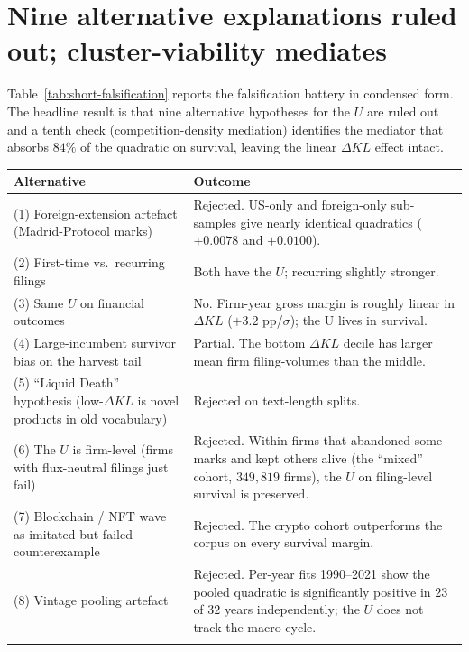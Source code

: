 \documentclass[11pt]{article}
\begin{document}
\section{Nine alternative explanations ruled out; cluster-viability mediates}

Table~\ref{tab:short-falsification} reports the falsification battery
in condensed form. The headline result is that nine alternative
hypotheses for the $U$ are ruled out and a tenth check
(competition-density mediation) identifies the mediator that absorbs
$84\%$ of the quadratic on survival, leaving the linear $\Delta KL$
effect intact.

\begin{table}[h]
\centering
\small
\begin{tabular}{p{4.0cm}p{11.2cm}}
\toprule
\textbf{Alternative} & \textbf{Outcome} \\
\midrule
(1) Foreign-extension artefact (Madrid-Protocol marks) &
Rejected. US-only and foreign-only sub-samples give nearly identical
quadratics ($+0.0078$ and $+0.0100$). \\
\addlinespace
(2) First-time vs.\ recurring filings &
Both have the $U$; recurring slightly stronger. \\
\addlinespace
(3) Same $U$ on financial outcomes &
No. Firm-year gross margin is roughly linear in $\Delta KL$ ($+3.2$ pp/$\sigma$);
the U lives in survival. \\
\addlinespace
(4) Large-incumbent survivor bias on the harvest tail &
Partial. The bottom $\Delta KL$ decile has larger mean firm
filing-volumes than the middle. \\
\addlinespace
(5) ``Liquid Death'' hypothesis (low-$\Delta KL$ is novel products in old vocabulary) &
Rejected on text-length splits. \\
\addlinespace
(6) The $U$ is firm-level (firms with flux-neutral filings just fail) &
Rejected. Within firms that abandoned some marks and kept others
alive (the ``mixed'' cohort, $349{,}819$ firms), the $U$ on
filing-level survival is preserved. \\
\addlinespace
(7) Blockchain / NFT wave as imitated-but-failed counterexample &
Rejected. The crypto cohort outperforms the corpus on every survival
margin. \\
\addlinespace
(8) Vintage pooling artefact &
Rejected. Per-year fits 1990--2021 show the pooled quadratic is
significantly positive in $23$ of $32$ years independently; the $U$
does not track the macro cycle. \\
\addlinespace

\end{tabular}
\end{table}
\end{document}
